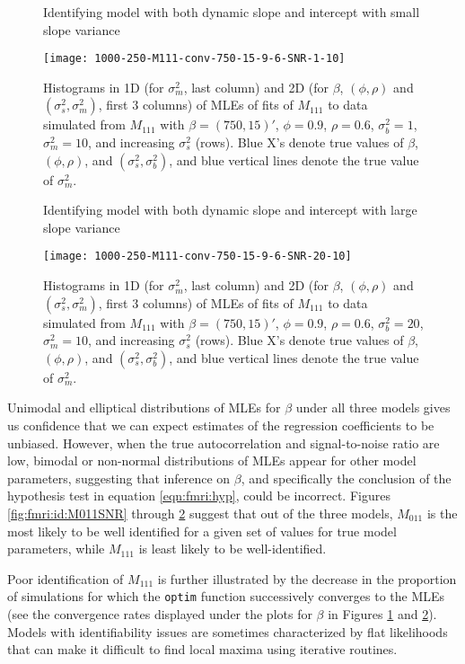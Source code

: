 \begin{figure}
\ssp
\centering
\caption{Identifying model with both dynamic slope and intercept with small slope variance} \label{fig:fmri:id:M111lowb}
\texttt{[image: 1000-250-M111-conv-750-15-9-6-SNR-1-10]}
\caption*{Histograms in 1D (for $\sigma^2_m$, last column) and 2D (for $\beta$, $(\phi,\rho)$ and $(\sigma^2_s,\sigma^2_m)$, first 3 columns) of MLEs of fits of $M_{111}$ to data simulated from $M_{111}$ with $\beta = (750,15)'$, $\phi = 0.9$, $\rho = 0.6$, $\sigma^2_b = 1$, $\sigma^2_m = 10$, and increasing $\sigma^2_s$ (rows). Blue X's denote true values of $\beta$, $(\phi,\rho)$, and $(\sigma^2_s,\sigma^2_b)$, and blue vertical lines denote the true value of $\sigma^2_m$.}
\end{figure}

\begin{figure}
\ssp
\centering
\caption{Identifying model with both dynamic slope and intercept with large slope variance} \label{fig:fmri:id:M111highb}
\texttt{[image: 1000-250-M111-conv-750-15-9-6-SNR-20-10]}
\caption*{Histograms in 1D (for $\sigma^2_m$, last column) and 2D (for $\beta$, $(\phi,\rho)$ and $(\sigma^2_s,\sigma^2_m)$, first 3 columns) of MLEs of fits of $M_{111}$ to data simulated from $M_{111}$ with $\beta = (750,15)'$, $\phi = 0.9$, $\rho = 0.6$, $\sigma^2_b = 20$, $\sigma^2_m = 10$, and increasing $\sigma^2_s$ (rows). Blue X's denote true values of $\beta$, $(\phi,\rho)$, and $(\sigma^2_s,\sigma^2_b)$, and blue vertical lines denote the true value of $\sigma^2_m$.}
\end{figure}

Unimodal and elliptical distributions of MLEs for $\beta$ under all three models gives us confidence that we can expect estimates of the regression coefficients to be unbiased. However, when the true autocorrelation and signal-to-noise ratio are low, bimodal or non-normal distributions of MLEs appear for other model parameters, suggesting that inference on $\beta$, and specifically the conclusion of the hypothesis test in equation \eqref{eqn:fmri:hyp}, could be incorrect. Figures \ref{fig:fmri:id:M011SNR} through \ref{fig:fmri:id:M111highb} suggest that out of the three models, $M_{011}$ is the most likely to be well identified for a given set of values for true model parameters, while $M_{111}$ is least likely to be well-identified.

Poor identification of $M_{111}$ is further illustrated by the decrease in the proportion of simulations for which the {\tt optim} function successively converges to the MLEs (see the convergence rates displayed under the plots for $\beta$ in Figures \ref{fig:fmri:id:M111lowb} and \ref{fig:fmri:id:M111highb}). Models with identifiability issues are sometimes characterized by flat likelihoods that can make it difficult to find local maxima using iterative routines.

